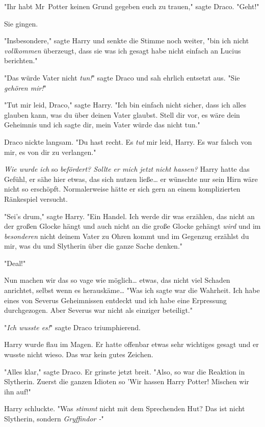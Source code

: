 {"Ihr habt Mr~Potter keinen Grund gegeben euch zu trauen," sagte Draco. "Geht!"

Sie gingen.

"Insbesondere," sagte Harry und senkte die Stimme noch weiter, "bin ich nicht \emph{vollkommen} überzeugt, dass sie was ich gesagt habe nicht einfach an Lucius berichten."

"Das würde Vater nicht \emph{tun!}" sagte Draco und sah ehrlich entsetzt aus. "Sie \emph{gehören mir!}"

"Tut mir leid, Draco," sagte Harry. "Ich bin einfach nicht sicher, dass ich alles glauben kann, was du über deinen Vater glaubst. Stell dir vor, es wäre dein Geheimnis und ich sagte dir, mein Vater würde das nicht tun."

Draco nickte langsam. "Du hast recht. Es \emph{tut} mir leid, Harry. Es war falsch von mir, es von dir zu verlangen."

\emph{Wie wurde ich} so \emph{befördert? Sollte er mich jetzt nicht hassen?} Harry hatte das Gefühl, er sähe hier etwas, das sich nutzen ließe… er wünschte nur sein Hirn wäre nicht so erschöpft. Normalerweise hätte er sich gern an einem komplizierten Ränkespiel versucht.

"Sei's drum," sagte Harry. "Ein Handel. Ich werde dir was erzählen, das nicht an der großen Glocke hängt und auch nicht an die große Glocke gehängt \emph{wird} und im \emph{besonderen} nicht deinem Vater zu Ohren kommt und im Gegenzug erzählst du mir, was du und Slytherin über die ganze Sache denken."

"Deal!"

Nun machen wir das so vage wie möglich… etwas, das nicht viel Schaden anrichtet, selbst wenn es herauskäme… "Was ich sagte war die Wahrheit. Ich habe eines von Severus Geheimnissen entdeckt und ich habe eine Erpressung durchgezogen. Aber Severus war nicht als einziger beteiligt."

"\emph{Ich wusste es!}" sagte Draco triumphierend.

Harry wurde flau im Magen. Er hatte offenbar etwas sehr wichtiges gesagt und er wusste nicht wieso. Das war kein gutes Zeichen.

"Alles klar," sagte Draco. Er grinste jetzt breit. "Also, so war die Reaktion in Slytherin. Zuerst die ganzen Idioten so 'Wir hassen Harry Potter! Mischen wir ihn auf!"

Harry schluckte. "Was \emph{stimmt} nicht mit dem Sprechenden Hut? Das ist nicht Slytherin, sondern \emph{Gryffindor -}"

}
